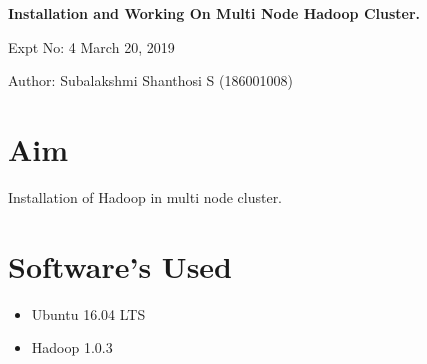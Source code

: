 \documentclass[a4paper,10pt]{article}
\begin{document}
\setcounter{secnumdepth}{-1} 

\begin{center}
\textbf{\LARGE Installation and Working On Multi Node Hadoop Cluster.}
\end{center}

\raggedright Expt No: 4 \hfill \raggedleft March  20, 2019 \\ 

\raggedright Author: Subalakshmi Shanthosi S  (186001008) \par 

\noindent\makebox[\linewidth]{\rule{\textwidth}{1pt}} 

\section{Aim}
Installation of Hadoop in multi node cluster.

\section{Software's Used}
\begin{itemize}
	\item Ubuntu  16.04 LTS
	\item Hadoop 1.0.3
\end{itemize}
\end{document}
